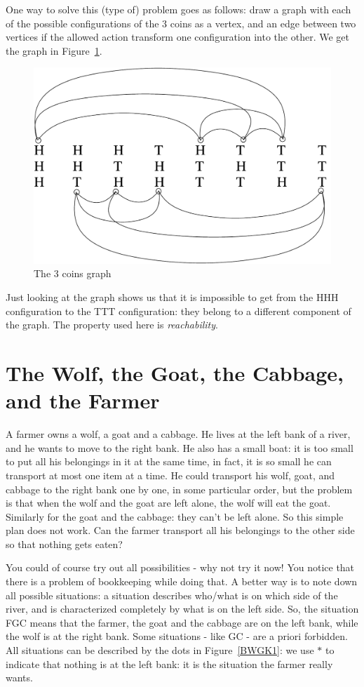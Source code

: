 One way to solve this (type of) problem goes as follows: draw a graph
with each of the possible configurations of the 3 coins as a vertex,
and an edge between two vertices if the allowed action transform one
configuration into the other. We get the graph in Figure~\ref{munten}.

\begin{figure}[ht]
\begin{center}
\includegraphics[width=0.5\linewidth,keepaspectratio]{munteneng}
\end{center}
\caption{The 3 coins graph \label{munten}}
\end{figure}

Just looking at the graph shows us that it is impossible to get from
the HHH configuration to the TTT configuration: they belong to a
different component of the graph. The property used here is {\em
reachability}.


\section{The Wolf, the Goat, the Cabbage, and the Farmer}

A farmer owns a wolf, a goat and a cabbage. He lives at the left bank
of a river, and he wants to move to the right bank. He also has a
small boat: it is too small to put all his belongings in it at the
same time, in fact, it is so small he can transport at most one
item at a time. He could transport his wolf, goat, and
cabbage to the right bank one by one, in some particular order, but the problem
is that when the wolf and the goat are left alone, the wolf will eat
the goat. Similarly for the goat and the cabbage: they can't be left
alone. So this simple plan does not work. Can the farmer transport all
his belongings to the other side so that nothing gets eaten?

You could of course try out all possibilities - why not try it now!
You notice that there is a problem of bookkeeping while doing that.
A better way is to note down all possible situations: a situation
describes who/what is on which side of the river, and is characterized
completely by what is on the left side. So, the situation FGC means
that the farmer, the goat and the cabbage are on the left bank, while
the wolf is at the right bank. Some situations - like GC - are a
priori forbidden. All situations can be described by the dots in
Figure~\ref{BWGK1}: we use $\ast$ to indicate that nothing is at the
left bank: it is the situation the farmer really wants.

